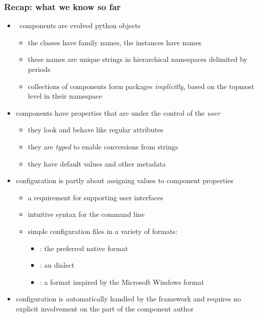 \begin{frame}
%
  \frametitle{Recap: what we know so far}
%
  \begin{itemize}
%
  \item \pyre\ components are evolved python objects
    \begin{itemize}
    \item the classes have family names, the instances have names
    \item these names are unique strings in hierarchical namespaces delimited by periods
    \item collections of components form packages \emph{implicitly}, based on the topmost level
      in their namespace
    \end{itemize}
%
  \item components have properties that are under the control of the \emph{user}
    \begin{itemize}
    \item they look and behave like regular attributes
    \item they are \emph{typed} to enable conversions from strings
    \item they have default values and other metadata
    \end{itemize}
%
  \item configuration is partly about assigning values to component properties
    \begin{itemize}
    \item a requirement for supporting user interfaces
    \item intuitive syntax for the command line
    \item simple configuration files in a variety of formats:
      \begin{itemize}
      \item {}: the preferred native format
      \item {}: an  dialect
      \item {}: a format inspired by the Microsoft Windows  format
      \end{itemize}
    \end{itemize}
%
  \item configuration is automatically handled by the framework and requires no explicit
    involvement on the part of the component author
%
  \end{itemize}
%
\end{frame}

